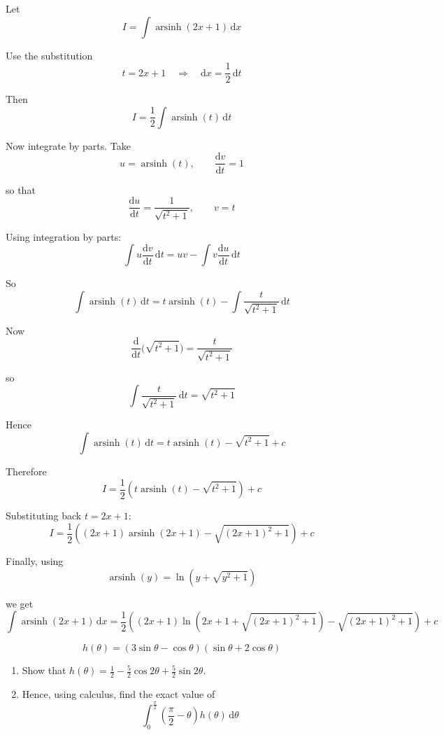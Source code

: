 \documentclass[leqno]{article}
\begin{document}
\begin{enumerate}[
  label=\textbf{\arabic*.},
  leftmargin=*,
  topsep=0pt,
  partopsep=0pt,
  parsep=0pt
]
\begin{djsSolution}
Let
\[
I=\int \operatorname{arsinh}(2x+1)\,\mathrm{d}x
\]

Use the substitution
\[
t=2x+1 \quad\Longrightarrow\quad \mathrm{d}x=\frac{1}{2}\,\mathrm{d}t
\]

Then
\[
I=\frac{1}{2}\int \operatorname{arsinh}(t)\,\mathrm{d}t
\]

Now integrate by parts. Take
\[
u=\operatorname{arsinh}(t), \qquad \frac{\mathrm{d}v}{\mathrm{d}t}=1
\]

so that
\[
\frac{\mathrm{d}u}{\mathrm{d}t}=\frac{1}{\sqrt{t^2+1}}, \qquad v=t
\]

Using integration by parts:
\[
\int u\frac{\mathrm{d}v}{\mathrm{d}t}\,\mathrm{d}t = uv - \int v\frac{\mathrm{d}u}{\mathrm{d}t}\,\mathrm{d}t
\]

So
\[
\int \operatorname{arsinh}(t)\,\mathrm{d}t
= t\operatorname{arsinh}(t)-\int \frac{t}{\sqrt{t^2+1}}\,\mathrm{d}t
\]

Now
\[
\frac{\mathrm{d}}{\mathrm{d}t}\bigl(\sqrt{t^2+1}\bigr)=\frac{t}{\sqrt{t^2+1}}
\]

so
\[
\int \frac{t}{\sqrt{t^2+1}}\,\mathrm{d}t=\sqrt{t^2+1}
\]

Hence
\[
\int \operatorname{arsinh}(t)\,\mathrm{d}t=t\operatorname{arsinh}(t)-\sqrt{t^2+1}+c
\]

Therefore
\[
I=\frac{1}{2}\left(t\operatorname{arsinh}(t)-\sqrt{t^2+1}\right)+c
\]

Substituting back \(t=2x+1\):
\[
I=\frac{1}{2}\left((2x+1)\operatorname{arsinh}(2x+1)-\sqrt{(2x+1)^2+1}\right)+c
\]

Finally, using
\[
\operatorname{arsinh}(y)=\ln\left(y+\sqrt{y^2+1}\right)
\]

we get
\[
\int \operatorname{arsinh}(2x+1)\,\mathrm{d}x
=
\frac{1}{2}\left((2x+1)\ln\left(2x+1+\sqrt{(2x+1)^2+1}\right)-\sqrt{(2x+1)^2+1}\right)+c
\]
\end{djsSolution}


\newpage

\questionitem

\[
h(\theta)=(3\sin\theta-\cos\theta)(\sin\theta+2\cos\theta)
\]
\begin{enumerate}[label=\textbf{(\alph*)}]
  \item Show that $h(\theta)=\frac{1}{2}-\frac{5}{2}\cos 2\theta+\frac{5}{2}\sin 2\theta$.  \\
  \item Hence, using calculus, find the exact value of
  \[
  \int_{0}^{\frac{\pi}{2}} \left(\frac{\pi}{2}-\theta\right) h(\theta)\,\mathrm{d}\theta
  \]
\end{enumerate}


\end{enumerate}
\end{document}
